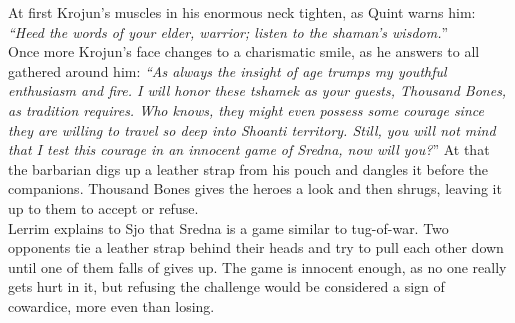 At first Krojun's muscles in his enormous neck tighten, as Quint warns him: {\itshape``Heed the words of your elder, warrior; listen to the shaman's wisdom.}''\\

Once more Krojun's face changes to a charismatic smile, as he answers to all gathered around him: {\itshape``As always the insight of age trumps my youthful enthusiasm and fire. I will honor these tshamek as your guests, Thousand Bones, as tradition requires. Who knows, they might even possess some courage since they are willing to travel so deep into Shoanti territory. Still, you will not mind that I test this courage in an innocent game of Sredna, now will you?}'' At that the barbarian digs up a leather strap from his pouch and dangles it before the companions. Thousand Bones gives the heroes a look and then shrugs, leaving it up to them to accept or refuse.\\

Lerrim explains to Sjo that Sredna is a game similar to tug-of-war. Two opponents tie a leather strap behind their heads and try to pull each other down until one of them falls of gives up. The game is innocent enough, as no one really gets hurt in it, but refusing the challenge would be considered a sign of cowardice, more even than losing.\\

